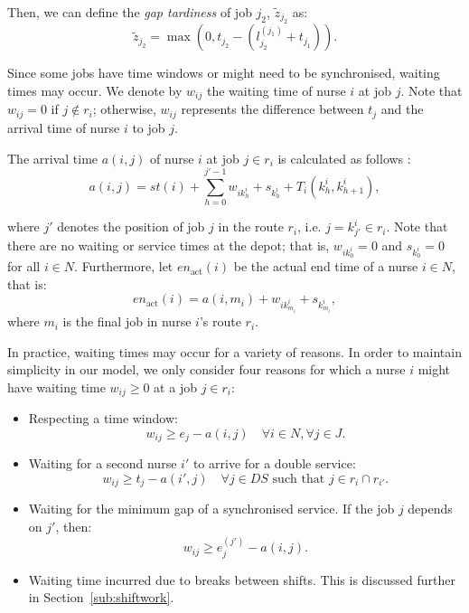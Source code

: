 \documentclass[a4paper,11pt,authoryear]{elsarticle}
\begin{document}
\noindent Then, we can define the \emph{gap tardiness} of job $j_2$, $\tilde{z}_{j_2}$ as:
\begin{equation}
    \tilde{z}_{j_2} = \max(0, t_{j_2} - (l^{(j_1)}_{j_2} + t_{j_1})). \label{eq:gaptardiness}
\end{equation}

\noindent Since some jobs have time windows or might need to be synchronised, waiting times may occur. We denote by $w_{ij}$ the waiting time of nurse $i$ at job $j$. Note that $w_{ij} = 0$ if $j \notin r_i$; otherwise, $w_{ij}$ represents the difference between $t_j$ and the arrival time of nurse $i$ to job $j$.%

The arrival time $a(i,j)$ of nurse $i$ at job $j \in r_i$ is calculated as follows :
\begin{equation}
    a(i,j) = st(i) + \sum_{h=0}^{j' - 1} w_{ik^i_h} + s_{k^i_h} + T_i(k^i_h, k^i_{h + 1}), \label{eq:arrivaltime}
\end{equation}

\noindent where $j'$ denotes the position of job $j$ in the route $r_i$, i.e. $j = k^i_{j'} \in r_i$. Note that there are no waiting or service times at the depot; that is, $w_{ik^i_0} = 0$ and $s_{k^i_0} = 0 $ for all $i \in N$. Furthermore, let $en_{\text{act}}(i)$ be the actual end time of a nurse $i \in N$, that is: 
\begin{equation}
	en_{\text{act}}(i) = a(i,m_i) + w_{ik_{m_i}^i} + s_{k_{m_i}^i}, \label{eq:actualendtime}
\end{equation}
where $m_i$ is the final job in nurse $i$'s route $r_i$.

In practice, waiting times may occur for a variety of reasons. In order to maintain simplicity in our model, we only consider four reasons for which a nurse $i$ might have waiting time $w_{ij} \geq 0$ at a job $j \in r_i$:
\begin{itemize}
    \item Respecting a time window: 
    \begin{equation}
        w_{ij} \geq e_j - a(i,j) \quad \forall i \in N, \forall j \in J. \label{eq:waiting1TW}
    \end{equation}
    \item Waiting for a second nurse $i'$ to arrive for a double service:
    \begin{equation}
        w_{i j} \geq t_j - a(i',j) \quad \forall j \in DS \text{ such that } j \in r_{i} \cap r_{i'}. \label{eq:waiting2DS}
    \end{equation}
    \item Waiting for the minimum gap of a synchronised service. If the job $j$ depends on $j'$, then:
    \begin{equation}\label{eq:waiting3dependent}
        w_{ij} \geq e^{(j')}_{j} - a(i,j).
    \end{equation}
	\item Waiting time incurred due to breaks between shifts. This is discussed further in Section~\ref{sub:shiftwork}.
\end{itemize}
\end{document}
